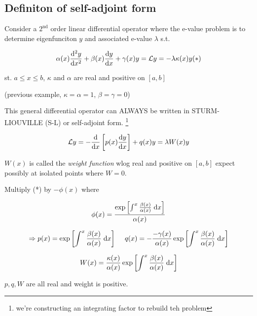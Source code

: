 \documentclass[a4paper]{article}
\begin{document}
\subsection{Definiton of self-adjoint form}

Consider a $ 2^{\text{nd}} $ order linear differential operator where the e-value problem is to determine eigenfunciton $ y $ and associated e-value $ \lambda $ s.t.

\[ \alpha(x) \frac{\mathrm{d}^{2} y}{\mathrm{d} x^{2}} + \beta(x) \frac{\mathrm{d} y}{\mathrm{d} x} + \gamma(x) y = \mathcal{L} y = - \lambda \kappa(x) y  (*) \]

st. $ a \leq x \leq b $, $ \kappa $ and $ \alpha $ are real and positive on $ [a,b] $


(previous example, $ \kappa = \alpha = 1 $, $ \beta = \gamma = 0 $)

This general differential operator can ALWAYS be written in STURM-LIOUVILLE (S-L) or self-adjoint form. \footnote{we're constructing an integrating factor to rebuild teh problem}

\[ \mathcal{L} y = - \frac{\mathrm{d} }{\mathrm{d} x} \left[ p(x) \frac{\mathrm{d} y}{\mathrm{d} x}  \right] + q(x) y = \lambda W(x) y \]

$ W(x) $ is called the \emph{weight function} wlog real and positive on $ [a,b] $ expect possibly at isolated points where $ W = 0 $.

Multiply (*) by $ - \phi(x) $ where

\[ \phi(x) = \frac{\exp \left[  \int^{x} \frac{\beta(x)}{\alpha(x)} \; \mathrm{d} x \right] }{\alpha(x)} \]


\[ \Rightarrow p(x) = \exp \left[ \int^{x} \frac{\beta(x)}{\alpha(x)} \; \mathrm{d} x \right] \; \quad q(x) = - \frac{-\gamma(x)}{\alpha(x)} \exp \left[ \int^{x} \frac{\beta(x)}{\alpha(x)} \; \mathrm{d} x \right] \]

\[ W(x) = \frac{\kappa(x)}{\alpha(x)} \exp \left[ \int^{x} \frac{\beta(x)}{\alpha(x)} \; \mathrm{d} x \right] \]

$ p,q,W $ are all real and weight is positive. 
\end{document}
